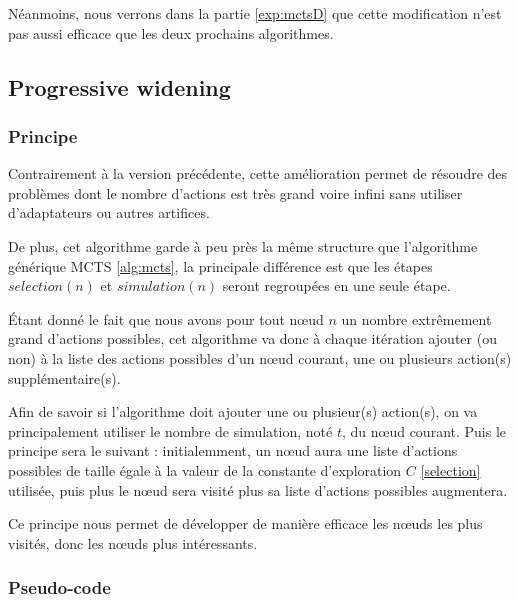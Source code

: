 \documentclass[pdftex,french, english]{article}	%
\begin{document}
		Néanmoins, nous verrons dans la partie \ref{exp:mctsD} que cette modification n'est pas aussi efficace que les deux prochains algorithmes.
	\subsection{Progressive widening} \label{pw}

		\subsubsection{Principe} \label{pw:principe}

		Contrairement à la version précédente, cette amélioration permet de résoudre des problèmes dont le nombre d'actions est très grand voire infini sans utiliser d'adaptateurs ou autres artifices.

		De plus, cet algorithme garde à peu près la même structure que l'algorithme générique MCTS \ref{alg:mcts}, la principale différence est que les étapes $selection(n)$ et $simulation(n)$ seront regroupées en une seule étape.

		Étant donné le fait que nous avons pour tout nœud $n$ un nombre extrêmement grand d'actions possibles, cet algorithme va donc à chaque itération ajouter (ou non) à la liste des actions possibles d'un nœud courant, une ou plusieurs action(s) supplémentaire(s).

		Afin de savoir si l'algorithme doit ajouter une ou plusieur(s) action(s), on va principalement utiliser le nombre de simulation, noté $t$, du nœud courant.
		Puis le principe sera le suivant : initialemment, un nœud aura une liste d'actions possibles de taille égale à la valeur de la constante d'exploration $C$ \ref{selection} utilisée, puis plus le nœud sera visité plus sa liste d'actions possibles augmentera.

		Ce principe nous permet de développer de manière efficace les nœuds les plus visités, donc les nœuds plus intéressants.

		\subsubsection{Pseudo-code} \label{pw:code}
\end{document}
